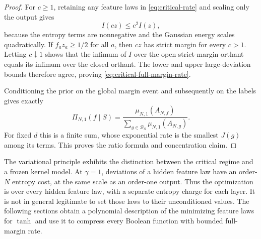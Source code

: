 \begin{proof}
For $c\geq1$, retaining any feature laws in \eqref{eq:critical-rate} and
scaling only the output gives
\[
 I(cz)\leq c^2 I(z),
\]
because the entropy terms are nonnegative and the Gaussian energy scales
quadratically. If $f_a z_a\geq1/2$ for all $a$, then $cz$ has strict
margin for every $c>1$. Letting $c\downarrow1$ shows that the infimum of
$I$ over the open strict-margin orthant equals its infimum over the
closed orthant. The lower and upper large-deviation bounds therefore agree,
proving \eqref{eq:critical-full-margin-rate}.

Conditioning the prior on the global margin event and subsequently on the
labels gives exactly
\[
 \Pi_{N,1}(f\mid S)=
 \frac{\mu_{N,1}(A_{N,f})}
 {\sum_{g\in\mathcal B_S}\mu_{N,1}(A_{N,g})}.
\]
For fixed $d$ this is a finite sum, whose exponential rate is the smallest
$J(g)$ among its terms. This proves the ratio formula and concentration
claim.
\end{proof}

The variational principle exhibits the distinction between the critical
regime and a frozen kernel model. At $\gamma=1$, deviations of a hidden
feature law have an order-$N$ entropy cost, at the same scale as an order-one
output. Thus the optimization is over every hidden feature law, with a
separate entropy charge for each layer. It is not in general legitimate to
set those laws to their unconditioned values. The following sections obtain a
polynomial description of the minimizing feature laws for $\tanh$ and use it
to compress every Boolean function with bounded full-margin rate.
